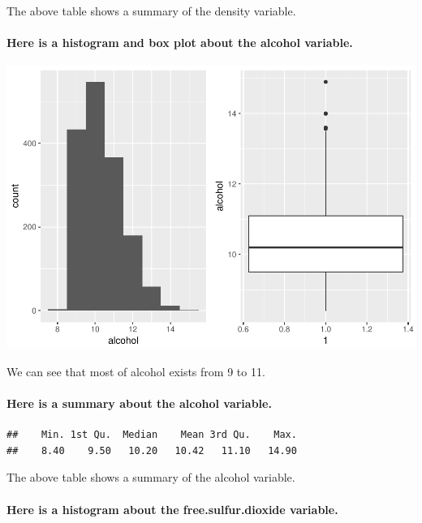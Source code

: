 \documentclass[]{article}
\let\oldparagraph\paragraph
\renewcommand{\paragraph}[1]{\oldparagraph{#1}\mbox{}}
\begin{document}
The above table shows a summary of the density variable.

\paragraph{Here is a histogram and box plot about the alcohol
variable.}\label{here-is-a-histogram-and-box-plot-about-the-alcohol-variable.}

\includegraphics{RedWine_files/figure-latex/Make_Plot_For_alcohol-1.pdf}

We can see that most of alcohol exists from 9 to 11.

\paragraph{Here is a summary about the alcohol
variable.}\label{here-is-a-summary-about-the-alcohol-variable.}

\begin{verbatim}
##    Min. 1st Qu.  Median    Mean 3rd Qu.    Max. 
##    8.40    9.50   10.20   10.42   11.10   14.90
\end{verbatim}

The above table shows a summary of the alcohol variable.

\paragraph{Here is a histogram about the free.sulfur.dioxide
variable.}\label{here-is-a-histogram-about-the-free.sulfur.dioxide-variable.}
\end{document}
